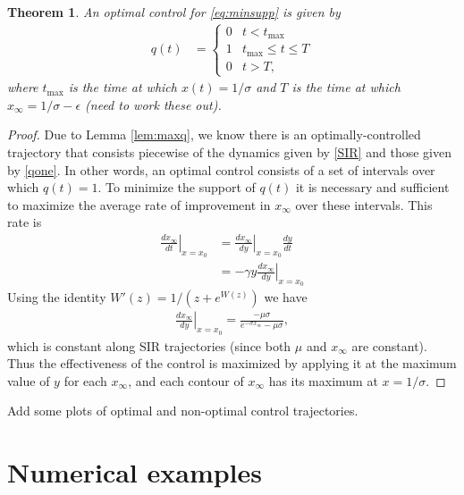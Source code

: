 \documentclass[english,12pt]{article}
\newtheorem{thm}{Theorem}
\begin{document}
\begin{thm}
An optimal control for \eqref{eq:minsupp} is given by
\begin{align}
    q(t) & = \begin{cases}  
        0 & t<t_{\max} \\
        1 & t_{\max}\le t \le T \\
        0 & t>T,
    \end{cases}
\end{align}
where $t_{\max}$ is the time at which $x(t)=1/\sigma$ and $T$ is the time
at which $x_\infty=1/\sigma-\epsilon$ (need to work these out).
\end{thm}
\begin{proof}
    Due to Lemma \ref{lem:maxq}, we know there is an optimally-controlled
    trajectory that consists piecewise of the dynamics given by \eqref{SIR}
    and those given by \eqref{qone}.  In other words, an optimal control consists
    of a set of intervals over which $q(t)=1$.  To minimize the support of $q(t)$
    it is necessary and sufficient to maximize the average rate of improvement
    in $x_\infty$ over these intervals.  This rate is
    \begin{align*}
        \left. \frac{dx_\infty}{dt}\right|_{x=x_0} & = \left. \frac{dx_\infty}{dy}\right|_{x=x_0} \frac{dy}{dt} \\
            & = -\gamma y \left. \frac{dx_\infty}{dy}\right|_{x=x_0}
    \end{align*}
    Using the identity $W'(z) = 1/(z+e^{W(z)})$ we have
    \begin{align*}
        \left. \frac{dx_\infty}{dy}\right|_{x=x_0} = \frac{-\mu \sigma}{e^{-\sigma x_\infty}-\mu\sigma},
    \end{align*}
    which is constant along SIR trajectories (since both $\mu$ and $x_\infty$ are constant).
    Thus the effectiveness of the control is maximized by applying it at the maximum
    value of $y$ for each $x_\infty$, and each contour of $x_\infty$ has its maximum
    at $x=1/\sigma$.
\end{proof}
Add some plots of optimal and non-optimal control trajectories.

\section{Numerical examples}



\end{document}
